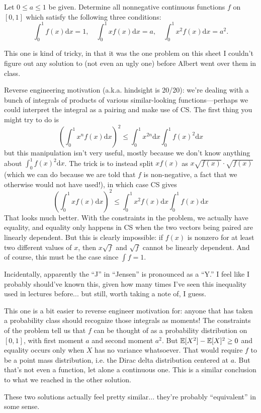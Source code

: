 \begin{problem}
	Let $0\leq a \leq 1$ be given. Determine all nonnegative continuous functions $f$ on $[0,1]$ which satisfy the following three conditions:
	\[
		\int_0^1 f(x) \mathrm{d}x = 1, \quad \int_0^1 xf(x) \mathrm{d}x = a, \quad \int_0^1 x^2 f(x) \mathrm{d}x = a^2.
	\]
\end{problem}
\begin{solution}
	This one is kind of tricky, in that it was the one problem on this sheet I couldn't figure out any solution to (not even an ugly one) before Albert went over them in class.
	
	Reverse engineering motivation (a.k.a. hindsight is 20/20): we're dealing with a bunch of integrals of products of various similar-looking functions---perhaps we could interpret the integral as a pairing and make use of CS. The first thing you might try to do is
	\[
		\left(\int_0^1 x^n f(x) \mathrm{d} x\right)^2 \leq \int_0^1 x^{2n} \mathrm{d} x \int_0^1 f(x)^2 \mathrm{d} x
	\]
	but this manipulation isn't very useful, mostly because we don't know anything about $\int_0^1 f(x)^2 \mathrm{d} x$.
	The trick is to instead split $xf(x)$ as $x\sqrt{f(x)} \cdot \sqrt{f(x)}$ (which we can do because we are told that $f$ is non-negative, a fact that we otherwise would not have used!), in which case CS gives
	\[
		\left(\int_0^1 x f(x) \mathrm{d}x \right)^2\leq \int_0^1 x^2 f(x)\mathrm{d}x \int_0^1 f(x) \mathrm{d}x
	\]
	That looks much better. With the constraints in the problem, we actually have equality, and equality only happens in CS when the two vectors being paired are linearly dependent. But this is clearly impossible: if $f(x)$ is nonzero for at least two different values of $x$, then $x\sqrt{f}$ and $\sqrt{f}$ cannot be linearly dependent. And of course, this must be the case since $\int f = 1$.
\end{solution}
\begin{solution}[2, Jensen's]
	Incidentally, apparently the ``J'' in ``Jensen'' is pronounced as a ``Y.'' I feel like I probably should've known this, given how many times I've seen this inequality used in lectures before... but still, worth taking a note of, I guess.
	
	This one is a bit easier to reverse engineer motivation for: anyone that has taken a probability class should recognize those integrals as moments! The constraints of the problem tell us that $f$ can be thought of as a probability distribution on $[0,1]$, with first moment $a$ and second moment $a^2$. But $\mathbb{E}[X^2] - \mathbb{E}[X]^2 \geq 0$ and equality occurs only when $X$ has no variance whatsoever. That would require $f$ to be a point mass distribution, i.e. the Dirac delta distribution centered at $a$. But that's not even a function, let alone a continuous one. This is a similar conclusion to what we reached in the other solution.
	
	These two solutions actually feel pretty similar... they're probably ``equivalent'' in some sense.
\end{solution}
